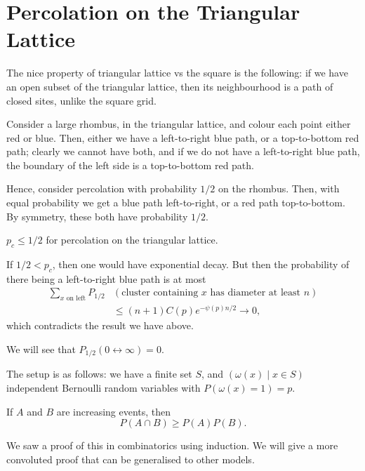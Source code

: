 \documentclass[12pt]{article}
\begin{document}
\newpage

\section{Percolation on the Triangular Lattice}%
\label{sec:triangle}

The nice property of triangular lattice vs the square is the following: if we have an open subset of the triangular lattice, then its neighbourhood is a path of closed sites, unlike the square grid.

Consider a large rhombus, in the triangular lattice, and colour each point either red or blue. Then, either we have a left-to-right blue path, or a top-to-bottom red path; clearly we cannot have both, and if we do not have a left-to-right blue path, the boundary of the left side is a top-to-bottom red path.

Hence, consider percolation with probability $1/2$ on the rhombus. Then, with equal probability we get a blue path left-to-right, or a red path top-to-bottom. By symmetry, these both have probability $1/2$.

\begin{proposition}
	$p_c \leq 1/2$ for percolation on the triangular lattice.
\end{proposition}

\begin{proofbox}
	If $1/2 < p_c$, then one would have exponential decay. But then the probability of there being a left-to-right blue path is at most
	\begin{align*}
		\sum_{x \text{ on left}} P_{1/2} &(\text{cluster containing $x$ has diameter at least $n$}) \\
		&\leq (n+1) C(p) e^{-\psi(p) n/2} \to 0,
	\end{align*}
	which contradicts the result we have above.
\end{proofbox}

We will see that $P_{1/2}(0 \leftrightarrow \infty) = 0$.


The setup is as follows: we have a finite set $S$, and $(\omega(x) \mid x \in S)$ independent Bernoulli random variables with $P(\omega(x) = 1) = p$.

\begin{proposition}
	If $A$ and $B$ are increasing events, then
	\[
	P(A \cap B) \geq P(A) P(B).
	\]
\end{proposition}

We saw a proof of this in combinatorics using induction. We will give a more convoluted proof that can be generalised to other models.
\end{document}
